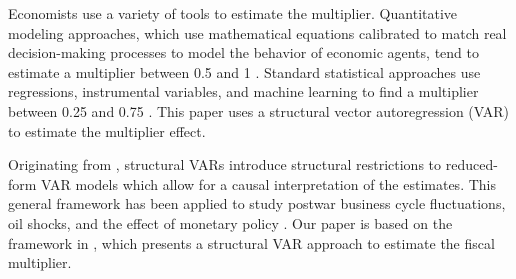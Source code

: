 Economists use a variety of tools to estimate the multiplier. Quantitative modeling approaches, which use mathematical equations calibrated to match real decision-making processes to model the behavior of economic agents, tend to estimate a multiplier between 0.5 and 1 \parencite{gechert2012fiscal}. Standard statistical approaches use regressions, instrumental variables, and machine learning to find a multiplier between 0.25 and 0.75 \parencite{gechert2012fiscal}. This paper uses a structural vector autoregression (VAR) to estimate the multiplier effect.

Originating from \textcite{sims1980macroeconomics}, structural VARs introduce structural restrictions to reduced-form VAR models which allow for a causal interpretation of the estimates.  This general framework has been applied to study postwar business cycle fluctuations, oil shocks, and the effect of monetary policy \parencites{hamilton1983oil}{hodrick1997postwar}{sims2006were}. Our paper is based on the framework in \textcite{blanchard2002empirical}, which presents a structural VAR approach to estimate the fiscal multiplier. 
